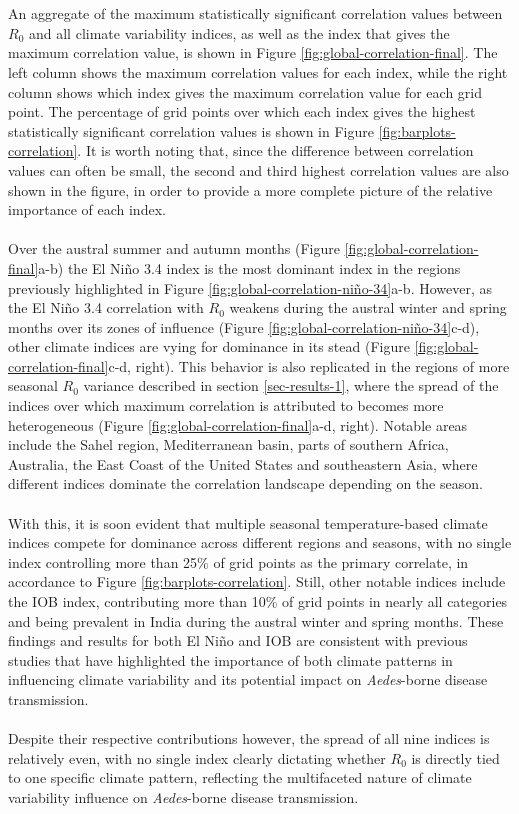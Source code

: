 \documentclass[10pt,twocolumn]{wlscirep}
\begin{document}
\\
\\
An aggregate of the maximum statistically significant correlation values between $R_0$ and all climate variability indices, as well as the index that gives the maximum correlation value, is shown in Figure \ref{fig:global-correlation-final}. The left column shows the maximum correlation values for each index, while the right column shows which index gives the maximum correlation value for each grid point. The percentage of grid points over which each index gives the highest statistically significant correlation values is shown in Figure \ref{fig:barplots-correlation}. It is worth noting that, since the difference between correlation values can often be small, the second and third highest correlation values are also shown in the figure, in order to provide a more complete picture of the relative importance of each index.
\\
\\
Over the austral summer and autumn months (Figure \ref{fig:global-correlation-final}a-b) the El Niño 3.4 index is the most dominant index in the regions previously highlighted in Figure \ref{fig:global-correlation-niño-34}a-b. However, as the El Niño 3.4 correlation with $R_0$ weakens during the austral winter and spring months over its zones of influence (Figure \ref{fig:global-correlation-niño-34}c-d), other climate indices are vying for dominance in its stead (Figure \ref{fig:global-correlation-final}c-d, right). This behavior is also replicated in the regions of more seasonal $R_0$ variance described in section \ref{sec-results-1}, where the spread of the indices over which maximum correlation is attributed to becomes more heterogeneous (Figure \ref{fig:global-correlation-final}a-d, right). Notable areas include the Sahel region, Mediterranean basin, parts of southern Africa, Australia, the East Coast of the United States and southeastern Asia, where different indices dominate the correlation landscape depending on the season.
\\
\\
With this, it is soon evident that multiple seasonal temperature-based climate indices compete for dominance across different regions and seasons, with no single index controlling more than 25\% of grid points as the primary correlate, in accordance to Figure \ref{fig:barplots-correlation}. Still, other notable indices include the IOB index, contributing more than 10\% of grid points in nearly all categories and being prevalent in India during the austral winter and spring months. These findings and results for both El Niño and IOB are consistent with previous studies that have highlighted the importance of both climate patterns in influencing climate variability and its potential impact on \textit{Aedes}-borne disease transmission\cite{chen_2024,kurnianingsih_2020, banu_2015}.
\\
\\
Despite their respective contributions however, the spread of all nine indices is relatively even, with no single index clearly dictating whether $R_0$ is directly tied to one specific climate pattern, reflecting the multifaceted nature of climate variability influence on \textit{Aedes}-borne disease transmission.
\end{document}
